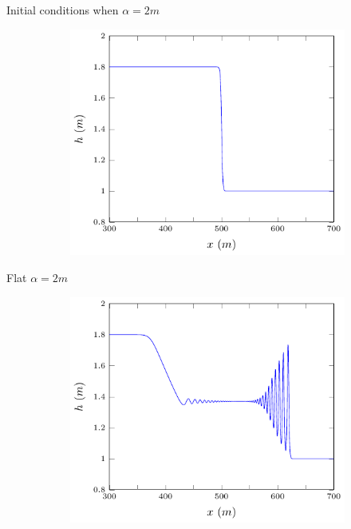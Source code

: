 \documentclass[pdf]{beamer}
\begin{document}
\begin{frame}{Initial conditions when $\alpha = 2m$}
	\begin{figure}
		\centering
		\begin{subfigure}{0.75\textwidth}
			\includegraphics[width=\textwidth]{../Pics/init/DBs6/1-figure0.pdf}
		\end{subfigure}%
	\end{figure}
\end{frame}

\begin{frame}{Flat $\alpha = 2m$}
	\begin{figure}
		\begin{subfigure}{0.75\textwidth}
			\includegraphics[width=\textwidth]{../Pics/DBstruct/6.pdf}
		\end{subfigure}
	\end{figure}
\end{frame}
\end{document}
